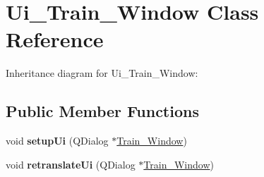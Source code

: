 \hypertarget{class_ui___train___window}{}\section{Ui\+\_\+\+Train\+\_\+\+Window Class Reference}
\label{class_ui___train___window}


Inheritance diagram for Ui\+\_\+\+Train\+\_\+\+Window\+:
\subsection*{Public Member Functions}
\begin{DoxyCompactItemize}
\item 
\mbox{\label{class_ui___train___window_aaa342eba97ba8fac78bcd23be280a4e1}} 
void {\bfseries setup\+Ui} (Q\+Dialog $\ast$\hyperlink{class_train___window}{Train\+\_\+\+Window})
\item 
\mbox{\label{class_ui___train___window_aa6fd5c0f33b6f7de0707608d0a9a7ffc}} 
void {\bfseries retranslate\+Ui} (Q\+Dialog $\ast$\hyperlink{class_train___window}{Train\+\_\+\+Window})
\end{DoxyCompactItemize}
